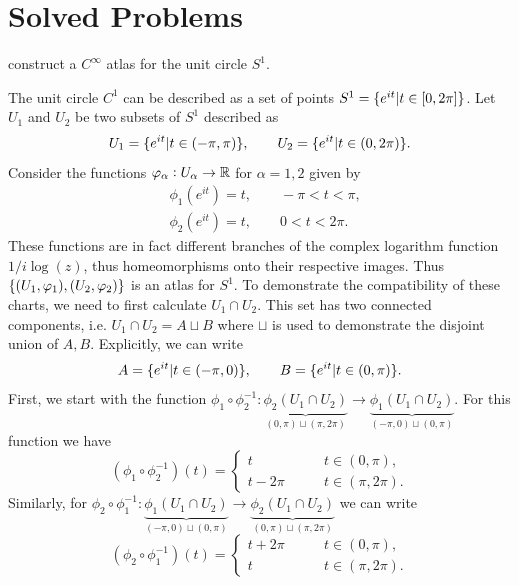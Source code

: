 \section{Solved Problems}


\begin{problem}
	\label{problem:AtlasForCircleComplexPlane}
	construct a $ C^\infty $ atlas for the unit circle $ S^1 $. 
\end{problem}
\begin{solution}
	The unit circle $ C^1 $ can be described as a set of points $ S^1 =  \{e^{it}| t \in [0,2\pi]\} $. Let $ U_1 $ and $ U_2 $ be two subsets of $ S^1 $ described as
	\[ U_1 = \{e^{it}| t \in (-\pi,\pi)\},\qquad U_2 = \{e^{it}| t \in (0,2\pi)\}. \]
	Consider the functions $ \varphi_\alpha: U_\alpha \to \mathbb{R} $ for $ \alpha = 1,2 $ given by
	\begin{align*}
		&\phi_1(e^{it}) = t, \qquad -\pi<t<\pi,\\
		&\phi_2(e^{it}) = t, \qquad 0<t<2\pi.
	\end{align*}
	These functions are in fact different branches of the complex logarithm function $ 1/i\log(z) $, thus homeomorphisms onto their respective images. Thus $ \{(U_1,\varphi_1),(U_2,\varphi_2)\} $ is an atlas for $ S^1 $. To demonstrate the compatibility of these charts, we need to first calculate $ U_1 \cap U_2 $. This set has two connected components, i.e. $ U_1 \cap U_2 = A \sqcup B $ where $ \sqcup $ is used to demonstrate the disjoint union of $ A,B $. Explicitly, we can write
	\[ A = \{e^{it}| t \in (-\pi,0)\}, \qquad B = \{e^{it}| t\in(0,\pi)\}. \]
	First, we start with the function $ \phi_1 \circ \phi_2^{-1}: \underbrace{\phi_2(U_1\cap U_2)}_{(0,\pi)\sqcup (\pi,2\pi)} \to \underbrace{\phi_1(U_1\cap U_2)}_{(-\pi,0)\sqcup (0,\pi)} $. For this function we have
	\[ (\phi_1\circ\phi_2^{-1})(t) = \begin{cases}
		t \qquad &t\in(0,\pi),\\
		t - 2\pi \qquad &t\in(\pi,2\pi).
	\end{cases} \]
	Similarly, for $ \phi_2 \circ \phi_1^{-1}: \underbrace{\phi_1(U_1\cap U_2)}_{(-\pi,0)\sqcup (0,\pi)} \to \underbrace{\phi_2(U_1\cap U_2)}_{(0,\pi)\sqcup (\pi,2\pi)} $ we can write
	\[ (\phi_2\circ\phi_1^{-1})(t) = \begin{cases}
		t+2\pi \qquad &t\in(0,\pi),\\
		t \qquad &t\in(\pi,2\pi).
	\end{cases} \]
	
	
\end{solution}

